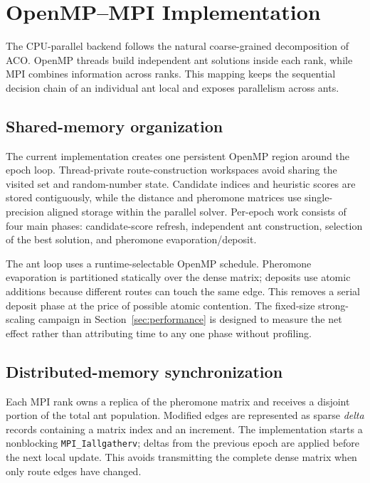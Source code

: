 \section{OpenMP--MPI Implementation}

The CPU-parallel backend follows the natural coarse-grained decomposition of ACO.  OpenMP threads build independent ant solutions inside each rank, while MPI combines information across ranks.  This mapping keeps the sequential decision chain of an individual ant local and exposes parallelism across ants.

\subsection{Shared-memory organization}

The current implementation creates one persistent OpenMP region around the epoch loop.  Thread-private route-construction workspaces avoid sharing the visited set and random-number state.  Candidate indices and heuristic scores are stored contiguously, while the distance and pheromone matrices use single-precision aligned storage within the parallel solver.  Per-epoch work consists of four main phases: candidate-score refresh, independent ant construction, selection of the best solution, and pheromone evaporation/deposit.

The ant loop uses a runtime-selectable OpenMP schedule.  Pheromone evaporation is partitioned statically over the dense matrix; deposits use atomic additions because different routes can touch the same edge.  This removes a serial deposit phase at the price of possible atomic contention.  The fixed-size strong-scaling campaign in Section~\ref{sec:performance} is designed to measure the net effect rather than attributing time to any one phase without profiling.

\subsection{Distributed-memory synchronization}

Each MPI rank owns a replica of the pheromone matrix and receives a disjoint portion of the total ant population.  Modified edges are represented as sparse \emph{delta} records containing a matrix index and an increment.  The implementation starts a nonblocking \texttt{MPI\_Iallgatherv}; deltas from the previous epoch are applied before the next local update.  This avoids transmitting the complete dense matrix when only route edges have changed.

